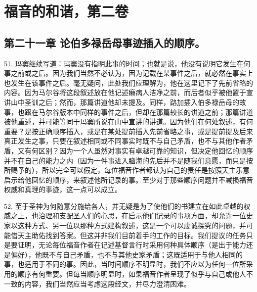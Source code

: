 

\section{福音的和谐，第二卷}


\subsection{第二十一章 论伯多禄岳母事迹插入的顺序。}

51. 玛窦继续写道：玛窦没有指明此事的时间；也就是说，他没有说明它发生在何事之前或之后。因为我们当然不必认为，因为记载在某事件之后，就必然在事实上也发生在该事件之后。毫无疑问，此处我们应理解为，他在这里记下了先前省略的内容。因为马尔谷将这段叙述放在他记述癞病人洁净之前，而后者似乎被他置于宣讲山中圣训之后；然而，那篇讲道他却未提及。同样，路加插入伯多禄岳母的故事，也跟在马尔谷版本中同样的事件之后，但却在那篇较长的讲道之前；那篇讲道被他重述，并可能等同于玛窦所说在山中宣讲的讲道。因为他们在何处叙述，有何重要？是按正确顺序插入，或是在某处提前插入先前省略之事，或是提前提及后来真正发生之事，只要在叙述相同或不同事实时既不与自己矛盾，也不与其他作者矛盾，又有何区别？因为一个人虽然对事实有卓越可靠的知识，但决定他回忆的顺序并不在自己的能力之内（因为一件事进入脑海的先后并不是随我们意愿，而只是按所赐予的），所以完全可以假定，每位福音作者都认为自己的责任是按照天主乐意启示给他回忆的顺序，来叙述他所记录的事。至少对于那些顺序问题并不减损福音权威和真理的事迹，这一点可以成立。\par

52. 至于圣神为何随意分施给各人，并无疑是为了使他们的书建立在如此卓越的权威之上，也治理和支配圣人们的心思，在启示他们记录的事项方面，却允许一位史家以这种方式、另一位以那种方式建构叙述，这是一个可以虔诚探究的问题，并可能借天主助佑找到答案。但这并非我们目前着手的工作的目标。我们提议的任务只是要证明，无论每位福音作者在记述基督言行时采用何种具体顺序（是出于能力还是偏好），他既不与自己矛盾，也不与其他史家矛盾；这既适用于与他人相同的事，也适用于不同的事。因此，当时间顺序不明显时，我们不应以为任何一位所采用的顺序有何重要。但每当顺序明显时，如果福音作者呈现了似乎与自己或他人不一致的内容，我们当然应当考虑这段经文，并尽力澄清困难。\par

